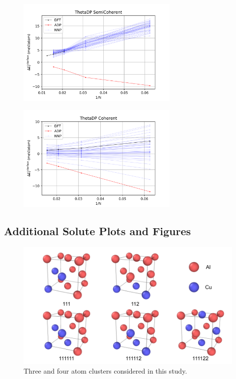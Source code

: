 \documentclass{article}
\begin{document}
\begin{figure}[H]%
\centering%
\includegraphics[width=0.7\textwidth,center]{figures/InterfaceSlope_ThetaDP_SemiCoherent.png}%
\end{figure}

\begin{figure}[H]%
\centering%
\includegraphics[width=0.7\textwidth,center]{figures/InterfaceSlope_ThetaDP_Coherent.png}%
\end{figure}


\subsection{Additional Solute Plots and Figures} \label{sct:adn_solsol}

\begin{figure}[H]%
\centering%
\includegraphics[width=1\textwidth,center]{figures/ClusterPlot-Daniel-2020.04.15.png}%
\caption{Three and four atom clusters considered in this study.}%
\label{fig:atomview_clusters}
\end{figure}
\end{document}
